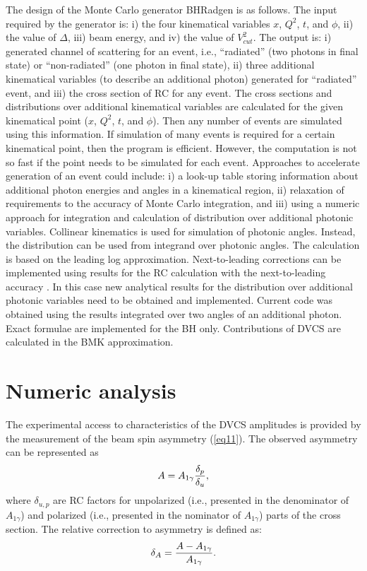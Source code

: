 \documentclass[aps,prd,reprint,groupedaddress,preprintnumbers,showpacs]{revtex4-1}
\begin{document}
 The design of the Monte Carlo generator BHRadgen is as follows.
The input required by the generator
is: i) the four kinematical variables $x$, $Q^2$, $t$, and $\phi$, ii) the value of $\Delta$, iii) beam energy, and iv) the value of $V^2_{cut}$. The 
output is: 
i)  generated channel of scattering for an event, i.e., ``radiated'' (two photons in final state) or ``non-radiated'' (one photon in final state),  
ii) three additional kinematical variables (to describe an additional photon) generated for ``radiated'' event, and
iii) the cross section of RC for any event.
The cross sections and distributions over additional kinematical variables are calculated for the given kinematical point ($x$, $Q^2$, $t$, and $\phi$). Then any number of events are simulated using this information. If simulation of many events is required for a certain kinematical point, then the program  is efficient. However, the computation is not so fast if the point needs to be simulated for each event. 
 Approaches to accelerate generation of an event could include: i) a look-up table storing information about additional photon energies and angles in a kinematical region, ii) relaxation of requirements to the accuracy of Monte Carlo integration, and iii) using a numeric approach for integration and calculation of distribution over additional photonic variables.
 Collinear kinematics is used for simulation of photonic angles. 
 Instead, the distribution can be used from integrand over photonic angles.
 The calculation is based on the leading log approximation. 
 Next-to-leading corrections can be implemented using results for the RC calculation with the next-to-leading accuracy \cite{AISh2014}. 
In this case new analytical results for the distribution over additional photonic variables need to be obtained and implemented. Current code was obtained using the results integrated over two angles of an additional photon.
Exact formulae are implemented for the BH only. Contributions of DVCS are calculated in the BMK approximation.

\section{Numeric analysis}
\label{SectNumeric}
The experimental access to characteristics of the DVCS amplitudes is provided by the measurement of the beam spin asymmetry (\ref{eq11}). The observed asymmetry can be represented as
\begin{equation}
A=A_{1\gamma}{\delta_p \over \delta_u},
\end{equation}
where $\delta_{u,p}$ are RC factors for unpolarized (i.e., presented in the denominator of $A_{1\gamma}$) and polarized (i.e., presented in the nominator of $A_{1\gamma}$) parts of the cross section. The relative correction to asymmetry is defined as:
\begin{equation}
\delta_A={A-A_{1\gamma} \over A_{1\gamma}}.
\end{equation}
\end{document}
